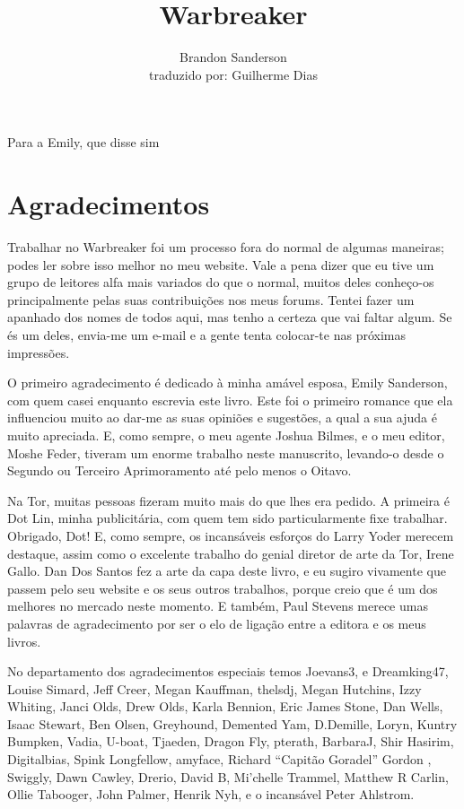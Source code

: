\documentclass[11pt,a4paper]{book}
\author{Brandon Sanderson \\ traduzido por: Guilherme Dias}
\title{Warbreaker}
\begin{document}
\maketitle
\newpage
Para a Emily, que disse sim
\tableofcontents
\chapter*{Agradecimentos}
Trabalhar no Warbreaker foi um processo fora do normal de algumas maneiras; podes ler sobre isso melhor no meu website. Vale a pena dizer que eu tive um grupo de leitores alfa mais variados do que o normal, muitos deles conheço-os principalmente pelas suas contribuições nos meus forums. Tentei fazer um apanhado dos nomes de todos aqui, mas tenho a certeza que vai faltar algum. Se és um deles, envia-me um e-mail e a gente tenta colocar-te nas próximas impressões.

O primeiro agradecimento é dedicado à minha amável esposa, Emily Sanderson, com quem casei enquanto escrevia este livro. Este foi o primeiro romance que ela influenciou muito ao dar-me as suas opiniões e sugestões, a qual a sua ajuda é muito apreciada. E, como sempre, o meu agente Joshua Bilmes, e o meu editor, Moshe Feder, tiveram um enorme trabalho neste manuscrito, levando-o desde o Segundo ou Terceiro Aprimoramento até pelo menos o Oitavo.

Na Tor, muitas pessoas fizeram muito mais do que lhes era pedido. A primeira é Dot Lin, minha publicitária, com quem tem sido particularmente fixe trabalhar. Obrigado, Dot! E, como sempre, os incansáveis esforços do Larry Yoder merecem destaque, assim como o excelente trabalho do genial diretor de arte da Tor, Irene Gallo. Dan Dos Santos fez a arte da capa deste livro, e eu sugiro vivamente que passem pelo seu website e os seus outros trabalhos, porque creio que é um dos melhores no mercado neste momento. E também, Paul Stevens merece umas palavras de agradecimento por ser o elo de ligação entre a editora e os meus livros.

No departamento dos agradecimentos especiais temos Joevans3, e Dreamking47, Louise Simard, Jeff Creer, Megan Kauffman, thelsdj, Megan Hutchins, Izzy Whiting, Janci Olds, Drew Olds, Karla Bennion, Eric James Stone, Dan Wells, Isaac Stewart, Ben Olsen, Greyhound, Demented Yam, D.Demille, Loryn, Kuntry Bumpken, Vadia, U-boat, Tjaeden, Dragon Fly, pterath, BarbaraJ, Shir Hasirim, Digitalbias, Spink Longfellow, amyface, Richard “Capitão Goradel” Gordon , Swiggly, Dawn Cawley, Drerio, David B, Mi’chelle Trammel, Matthew R Carlin, Ollie Tabooger, John Palmer, Henrik Nyh, e o incansável Peter Ahlstrom.
\end{document}
